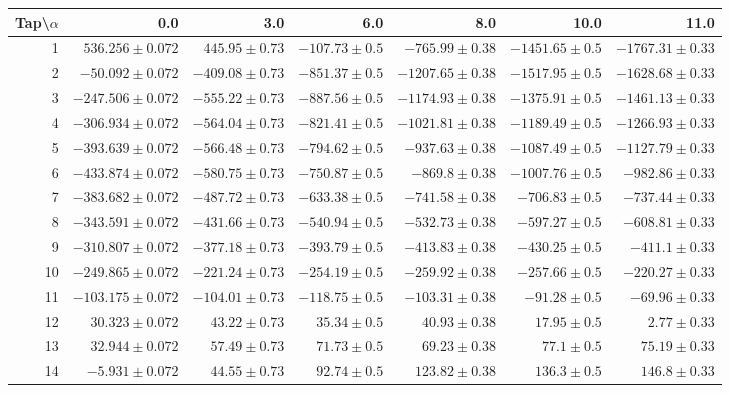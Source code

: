 \documentclass[runningheads]{llncs}
\begin{document}
\begin{table}
\begin{center}
\begin{tabular}{rrrrrrr}
\toprule
{}Tap\textbackslash$\alpha$ &              0.0  &              3.0  &             6.0  &               8.0  &              10.0 &    
           11.0 \\
\midrule
1  &   $536.256\pm0.072$ &   $445.95\pm0.73$ &  $-107.73\pm0.5$ &   $-765.99\pm0.38$ &  $-1451.65\pm0.5$ &  $-1767.31\pm0.33$ \\
2  &   $-50.092\pm0.072$ &  $-409.08\pm0.73$ &  $-851.37\pm0.5$ &  $-1207.65\pm0.38$ &  $-1517.95\pm0.5$ &  $-1628.68\pm0.33$ \\
3  &  $-247.506\pm0.072$ &  $-555.22\pm0.73$ &  $-887.56\pm0.5$ &  $-1174.93\pm0.38$ &  $-1375.91\pm0.5$ &  $-1461.13\pm0.33$ \\
4  &  $-306.934\pm0.072$ &  $-564.04\pm0.73$ &  $-821.41\pm0.5$ &  $-1021.81\pm0.38$ &  $-1189.49\pm0.5$ &  $-1266.93\pm0.33$ \\
5  &  $-393.639\pm0.072$ &  $-566.48\pm0.73$ &  $-794.62\pm0.5$ &   $-937.63\pm0.38$ &  $-1087.49\pm0.5$ &  $-1127.79\pm0.33$ \\
6  &  $-433.874\pm0.072$ &  $-580.75\pm0.73$ &  $-750.87\pm0.5$ &    $-869.8\pm0.38$ &  $-1007.76\pm0.5$ &   $-982.86\pm0.33$ \\
7  &  $-383.682\pm0.072$ &  $-487.72\pm0.73$ &  $-633.38\pm0.5$ &   $-741.58\pm0.38$ &   $-706.83\pm0.5$ &   $-737.44\pm0.33$ \\
8  &  $-343.591\pm0.072$ &  $-431.66\pm0.73$ &  $-540.94\pm0.5$ &   $-532.73\pm0.38$ &   $-597.27\pm0.5$ &   $-608.81\pm0.33$ \\
9  &  $-310.807\pm0.072$ &  $-377.18\pm0.73$ &  $-393.79\pm0.5$ &   $-413.83\pm0.38$ &   $-430.25\pm0.5$ &    $-411.1\pm0.33$ \\
10 &  $-249.865\pm0.072$ &  $-221.24\pm0.73$ &  $-254.19\pm0.5$ &   $-259.92\pm0.38$ &   $-257.66\pm0.5$ &   $-220.27\pm0.33$ \\
11 &  $-103.175\pm0.072$ &  $-104.01\pm0.73$ &  $-118.75\pm0.5$ &   $-103.31\pm0.38$ &    $-91.28\pm0.5$ &    $-69.96\pm0.33$ \\
12 &    $30.323\pm0.072$ &    $43.22\pm0.73$ &    $35.34\pm0.5$ &     $40.93\pm0.38$ &     $17.95\pm0.5$ &      $2.77\pm0.33$ \\
13 &    $32.944\pm0.072$ &    $57.49\pm0.73$ &    $71.73\pm0.5$ &     $69.23\pm0.38$ &      $77.1\pm0.5$ &     $75.19\pm0.33$ \\
14 &    $-5.931\pm0.072$ &    $44.55\pm0.73$ &    $92.74\pm0.5$ &    $123.82\pm0.38$ &     $136.3\pm0.5$ &     $146.8\pm0.33$ \\

\end{tabular}
\end{center}
\end{table}
\end{document}
